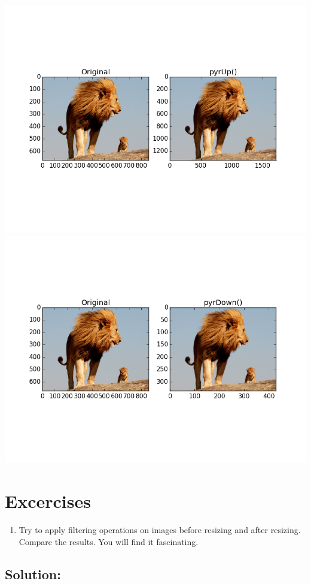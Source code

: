 \documentclass[]{article}
\providecommand{\tightlist}{%
  \setlength{\itemsep}{0pt}\setlength{\parskip}{0pt}}
\begin{document}
\includegraphics{pyrUp().png}
\includegraphics{pyrDown().png}

\section{Excercises}\label{excercises}

\begin{enumerate}
\def\labelenumi{\arabic{enumi}.}
\tightlist
\item
  Try to apply filtering operations on images before resizing and after
  resizing. Compare the results. You will find it fascinating.
\end{enumerate}

\subsection{Solution:}\label{solution}
\end{document}
